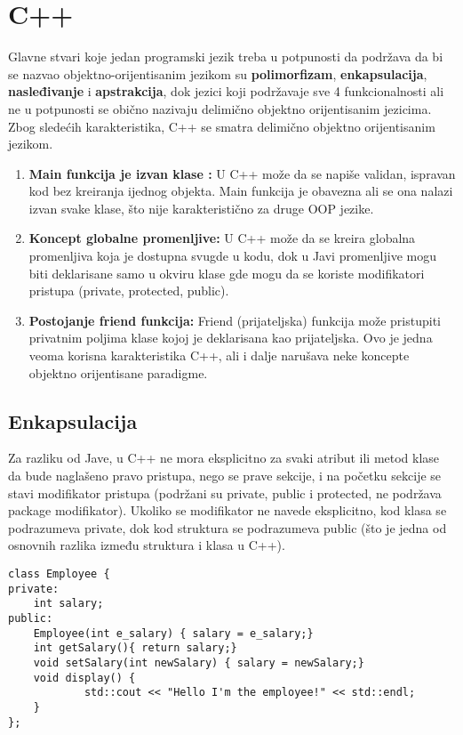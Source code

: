 \documentclass[a4paper]{article}
\begin{document}
\newpage

\section{C++}
\label{sec:c++}
Glavne stvari koje jedan programski jezik treba u potpunosti da podržava da bi se nazvao objektno-orijentisanim jezikom su \textbf{polimorfizam}, \textbf{enkapsulacija}, \textbf{nasleđivanje} i \textbf{apstrakcija}, dok jezici koji podržavaje sve 4 funkcionalnosti ali ne u potpunosti se obično nazivaju delimično objektno orijentisanim jezicima. Zbog sledećih karakteristika, C++ se smatra delimično objektno orijentisanim jezikom.
\begin{enumerate}
\item \textbf{Main funkcija je izvan klase :} U C++ može da se napiše validan, ispravan kod bez kreiranja ijednog objekta. Main funkcija je obavezna ali se ona nalazi izvan svake klase, što nije karakteristično za druge OOP jezike.
\item \textbf{Koncept globalne promenljive:} U C++ može da se kreira globalna promenljiva koja je dostupna svugde u kodu, dok u Javi promenljive mogu biti deklarisane samo u okviru klase gde mogu da se koriste modifikatori pristupa (private, protected, public).
\item \textbf{Postojanje friend funkcija:} Friend (prijateljska) funkcija može pristupiti privatnim poljima klase kojoj je deklarisana kao prijateljska. Ovo je jedna veoma korisna karakteristika C++, ali i dalje narušava neke koncepte objektno orijentisane paradigme.
\end{enumerate}

\subsection{Enkapsulacija}
\label{subsec:c++Enkapsulacija}
Za razliku od Jave, u C++ ne mora eksplicitno za svaki atribut ili metod klase da bude naglašeno pravo pristupa, nego se prave sekcije, i na početku sekcije se stavi modifikator pristupa (podržani su private, public i protected, ne podržava package modifikator). Ukoliko se modifikator ne navede eksplicitno, kod klasa se podrazumeva private, dok kod struktura se podrazumeva public (što je jedna od osnovnih razlika između struktura i klasa u C++).
\begin{lstlisting}[caption={Primer deklarisanja klase sa enkapsulacijom},frame=single, label=lst:c++Deklaracija]
class Employee {
private:
	int salary;
public: 
	Employee(int e_salary) { salary = e_salary;}
	int getSalary(){ return salary;}
	void setSalary(int newSalary) { salary = newSalary;}
	void display() {
     		std::cout << "Hello I'm the employee!" << std::endl;
	}
};
\end{lstlisting}
\end{document}
